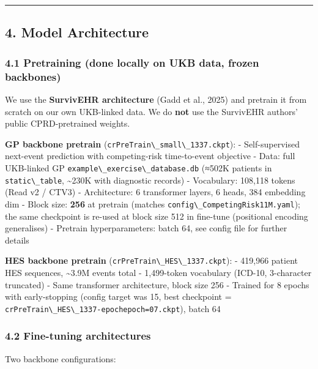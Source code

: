 \documentclass[
  11pt,
]{article}
\newcommand{\passthrough}[1]{#1}
\begin{document}
\begin{center}\rule{0.5\linewidth}{0.5pt}\end{center}

\subsection{4. Model Architecture}\label{model-architecture}

\subsubsection{4.1 Pretraining (done locally on UKB data, frozen
backbones)}\label{pretraining-done-locally-on-ukb-data-frozen-backbones}

We use the \textbf{SurvivEHR architecture} (Gadd et al., 2025) and
pretrain it from scratch on our own UKB-linked data. We do \textbf{not}
use the SurvivEHR authors' public CPRD-pretrained weights.

\textbf{GP backbone pretrain}
(\passthrough{\lstinline!crPreTrain\_small\_1337.ckpt!}): -
Self-supervised next-event prediction with competing-risk time-to-event
objective - Data: full UKB-linked GP
\passthrough{\lstinline!example\_exercise\_database.db!} (≈502K patients
in \passthrough{\lstinline!static\_table!}, \textasciitilde230K with
diagnostic records) - Vocabulary: 108,118 tokens (Read v2 / CTV3) -
Architecture: 6 transformer layers, 6 heads, 384 embedding dim - Block
size: \textbf{256} at pretrain (matches
\passthrough{\lstinline!config\_CompetingRisk11M.yaml!}); the same
checkpoint is re-used at block size 512 in fine-tune (positional
encoding generalises) - Pretrain hyperparameters: batch 64, see config
file for further details

\textbf{HES backbone pretrain}
(\passthrough{\lstinline!crPreTrain\_HES\_1337.ckpt!}): - 419,966
patient HES sequences, \textasciitilde3.9M events total - 1,499-token
vocabulary (ICD-10, 3-character truncated) - Same transformer
architecture, block size 256 - Trained for 8 epochs with early-stopping
(config target was 15, best checkpoint =
\passthrough{\lstinline!crPreTrain\_HES\_1337-epochepoch=07.ckpt!}),
batch 64

\subsubsection{4.2 Fine-tuning
architectures}\label{fine-tuning-architectures}

Two backbone configurations:
\end{document}
